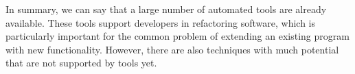 \documentclass[conference,compsoc,a4paper]{IEEEtran}
\begin{document}
In summary, we can say that a large number of automated tools are already available. These tools support developers in 
refactoring software, which is particularly important for the common problem of extending an existing program with new 
functionality. However, there are also techniques with much potential that are not supported by tools yet.







\end{document}
